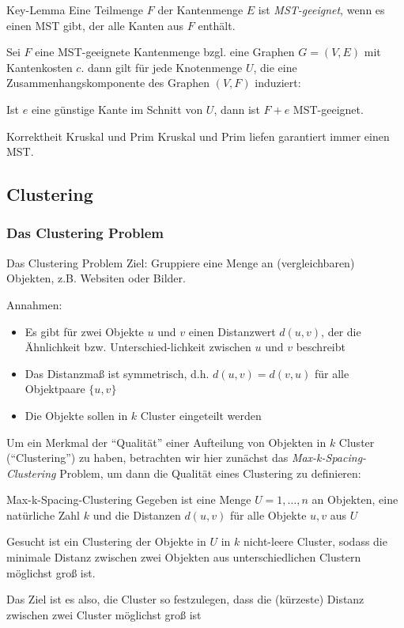\documentclass{panikzettel}
\begin{document}
\begin{defi}{Key-Lemma}
	Eine Teilmenge $F$ der Kantenmenge $E$ ist \emph{MST-geeignet}, wenn es einen MST gibt, der alle Kanten aus $F$ enthält. 
	
	Sei $F$ eine MST-geeignete Kantenmenge bzgl. eine Graphen $G = (V,E)$ mit Kantenkosten $c$. dann gilt für jede Knotenmenge $U$, die eine Zusammenhangskomponente des Graphen $(V,F)$ induziert:
	
	Ist $e$ eine günstige Kante im Schnitt von $U$, dann ist $F+e$ MST-geeignet.
\end{defi}


\begin{theo}{Korrektheit Kruskal und Prim}
	Kruskal und Prim liefen garantiert immer einen MST.
\end{theo}

\subsection{Clustering}

\subsubsection{Das Clustering Problem}

\begin{defi}{Das Clustering Problem}
	Ziel: Gruppiere eine Menge an (vergleichbaren) Objekten, z.B. Websiten oder Bilder.
	
	Annahmen:
	\begin{itemize}
		\item Es gibt für zwei Objekte $u$ und $v$ einen Distanzwert $d(u,v)$, der die Ähnlichkeit bzw. Unterschied-lichkeit zwischen $u$ und $v$ beschreibt
		\item Das Distanzmaß ist symmetrisch, d.h. $d(u,v) = d(v,u)$ für alle Objektpaare $\{u,v\}$
		\item Die Objekte sollen in $k$ Cluster eingeteilt werden
	\end{itemize}
\end{defi}

Um ein Merkmal der ``Qualität'' einer Aufteilung von Objekten in $k$ Cluster (``Clustering'') zu haben, betrachten wir hier zunächst das \emph{Max-k-Spacing-Clustering} Problem, um dann die Qualität eines Clustering zu definieren:

\begin{defi}{Max-k-Spacing-Clustering}
	Gegeben ist eine Menge $U = 1,\dots, n$ an Objekten, eine natürliche Zahl $k$ und die Distanzen $d(u,v)$ für alle Objekte $u,v$ aus $U$
	
	Gesucht ist ein Clustering der Objekte in $U$ in $k$ nicht-leere Cluster, sodass die minimale Distanz zwischen zwei Objekten aus unterschiedlichen Clustern möglichst groß ist. 
	
	Das Ziel ist es also, die Cluster so festzulegen, dass die (kürzeste) Distanz zwischen zwei Cluster möglichst groß ist
\end{defi}
\end{document}
